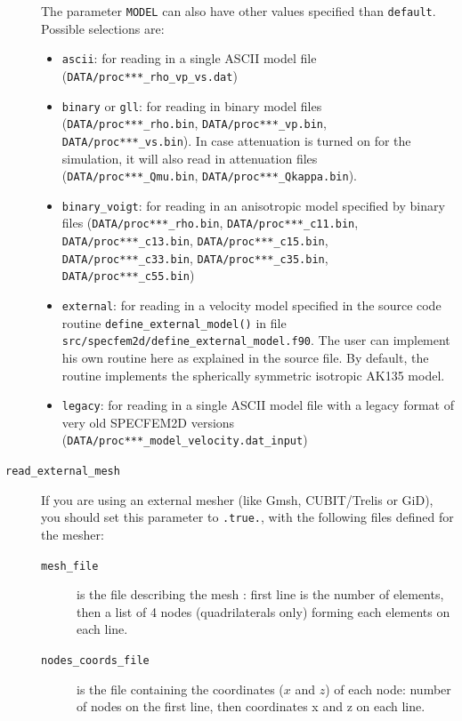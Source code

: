 \begin{description}
The parameter \texttt{MODEL} can also have other values specified than \texttt{default}. Possible selections are:
\begin{itemize}
\item \texttt{ascii}: for reading in a single ASCII model file (\texttt{DATA/proc***\_rho\_vp\_vs.dat})
\item \texttt{binary} or \texttt{gll}: for reading in binary model files (\texttt{DATA/proc***\_rho.bin}, \texttt{DATA/proc***\_vp.bin}, \texttt{DATA/proc***\_vs.bin}). In case attenuation is turned on for the simulation, it will also read in attenuation files (\texttt{DATA/proc***\_Qmu.bin}, \texttt{DATA/proc***\_Qkappa.bin}).
\item \texttt{binary\_voigt}: for reading in an anisotropic model specified by binary files (\texttt{DATA/proc***\_rho.bin}, \texttt{DATA/proc***\_c11.bin}, \texttt{DATA/proc***\_c13.bin}, \texttt{DATA/proc***\_c15.bin}, \texttt{DATA/proc***\_c33.bin}, \texttt{DATA/proc***\_c35.bin}, \texttt{DATA/proc***\_c55.bin})
\item \texttt{external}: for reading in a velocity model specified in the source code routine \texttt{define\_external\_model()} in file \texttt{src/specfem2d/define\_external\_model.f90}. The user can implement his own routine here as explained in the source file. By default, the routine implements the spherically symmetric isotropic AK135 model.
\item \texttt{legacy}: for reading in a single ASCII model file with a legacy format of very old SPECFEM2D versions (\texttt{DATA/proc***\_model\_velocity.dat\_input})
\end{itemize}


\item[{\texttt{read\_external\_mesh}}]
 If you are using an external mesher (like Gmsh, CUBIT/Trelis or GiD), you should set this parameter to \texttt{.true.}, with the following files defined for the mesher:
  \begin{description}
     \item[{\texttt{mesh\_file}}] is the file describing the mesh : first line is the number of elements, then a list of 4 nodes (quadrilaterals only) forming each elements on each line.

     \item[{\texttt{nodes\_coords\_file}}] is the file containing the coordinates ($x$ and $z$) of each node: number of nodes on the first line, then coordinates x and z on each line.


\end{description}
\end{description}
